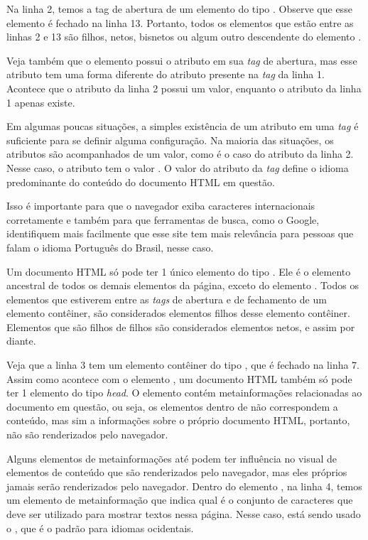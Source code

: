 Na linha 2, temos a tag de abertura de um elemento do tipo . Observe que esse elemento é fechado na linha 13. Portanto, todos os elementos que estão entre as linhas 2 e 13 são filhos, netos, bisnetos ou algum outro descendente do elemento . 

Veja também que o elemento  possui o atributo  em sua \textit{tag} de abertura, mas esse atributo tem uma forma diferente do atributo  presente na \textit{tag} da linha 1. Acontece que o atributo da linha 2 possui um valor, enquanto o atributo da linha 1 apenas existe.

Em algumas poucas situações, a simples existência de um atributo em uma \textit{tag} é suficiente para se definir alguma configuração. Na maioria das situações, os atributos são acompanhados de um valor, como é o caso do atributo da linha 2. Nesse caso, o atributo  tem o valor . O valor do atributo  da \textit{tag}  define o idioma predominante do conteúdo do documento HTML em questão. 

Isso é importante para que o navegador exiba caracteres internacionais corretamente e também para que ferramentas de busca, como o Google, identifiquem mais facilmente que esse site tem mais relevância para pessoas que falam o idioma Português do Brasil, nesse caso.

Um documento HTML só pode ter 1 único elemento do tipo . Ele é o elemento ancestral de todos os demais elementos da página, exceto do elemento . Todos os elementos que estiverem entre as \textit{tags} de abertura e de fechamento de um elemento contêiner, são considerados elementos filhos desse elemento contêiner. Elementos que são filhos de filhos são considerados elementos netos, e assim por diante.

Veja que a linha 3 tem um elemento contêiner do tipo , que é fechado na linha 7. Assim como acontece com o elemento , um documento HTML também só pode ter 1 elemento do tipo \textit{head}. O elemento  contém metainformações relacionadas ao documento em questão, ou seja, os elementos dentro de  não correspondem a conteúdo, mas sim a informações sobre o próprio documento HTML, portanto, não são renderizados pelo navegador.

Alguns elementos de metainformações até podem ter influência no visual de elementos de conteúdo que são renderizados pelo navegador, mas eles próprios jamais serão renderizados pelo navegador. Dentro do elemento , na linha 4, temos um elemento de metainformação que indica qual é o conjunto de caracteres que deve ser utilizado para mostrar textos nessa página. Nesse caso, está sendo usado o , que é o padrão para idiomas ocidentais.

